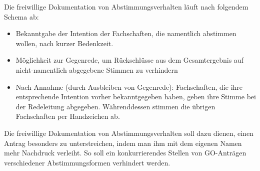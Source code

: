 \documentclass[
  ngerman,
  a4paper,
  oneside]{scrartcl}
\providecommand{\tightlist}{%
  \setlength{\itemsep}{0pt}\setlength{\parskip}{0pt}}
\begin{document}
Die freiwillige Dokumentation von Abstimmungsverhalten läuft nach
folgendem Schema ab:

\begin{itemize}
\tightlist
\item
  Bekanntgabe der Intention der Fachschaften, die namentlich abstimmen
  wollen, nach kurzer Bedenkzeit.
\item
  Möglichkeit zur Gegenrede, um Rückschlüsse aus dem Gesamtergebnis auf
  nicht-namentlich abgegebene Stimmen zu verhindern
\item
  Nach Annahme (durch Ausbleiben von Gegenrede): Fachschaften, die ihre
  entsprechende Intention vorher bekanntgegeben haben, geben ihre Stimme
  bei der Redeleitung abgegeben. Währenddessen stimmen die übrigen
  Fachschaften per Handzeichen ab.
\end{itemize}

Die freiwillige Dokumentation von Abstimmungsverhalten soll dazu dienen,
einen Antrag besonders zu unterstreichen, indem man ihm mit dem eigenen
Namen mehr Nachdruck verleiht. So soll ein konkurrierendes Stellen von
GO-Anträgen verschiedener Abstimmungsformen verhindert werden.
\end{document}
